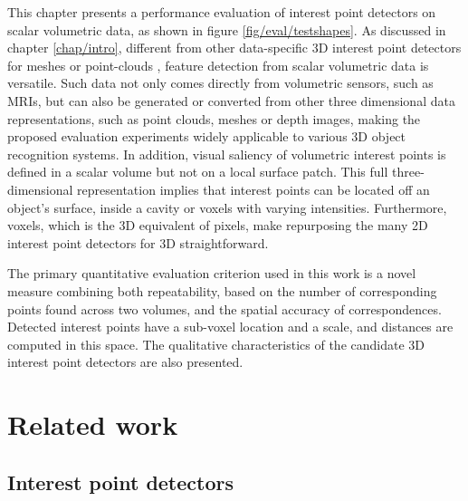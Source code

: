 This chapter presents a performance evaluation of interest point detectors on scalar volumetric data, as shown in figure \ref{fig/eval/testshapes}.   
As discussed in chapter \ref{chap/intro}, different from other data-specific 3D interest point detectors for meshes \cite{Sipiran2011,Glomb2009,Zaharescu2009} or point-clouds \cite{Aanaes2012,Unnikrishnan2008}, feature detection from scalar volumetric data is versatile. Such data not only comes directly from volumetric sensors, such as MRIs, but can also be generated or converted from other three dimensional data representations, such as point clouds, meshes or depth images, making the proposed evaluation experiments widely applicable to various 3D object recognition systems.
In addition, visual saliency of volumetric interest points is defined in a scalar volume but not on a local surface patch. This full three-dimensional representation implies that interest points can be located off an object's surface, \eg inside a cavity or voxels with varying intensities. 
Furthermore, voxels, which is the 3D equivalent of pixels, make repurposing the many 2D interest point detectors for 3D straightforward. 

The primary quantitative evaluation criterion used in this work is a novel measure combining both repeatability, based on the number of corresponding points found across two volumes, and the spatial accuracy of correspondences. Detected interest points have a sub-voxel location and a scale, and distances are computed in this space. The qualitative characteristics of the candidate 3D interest point detectors are also presented. 

\section{Related work}
\label{sec/eval/relatedwork}

\subsection{Interest point detectors}

